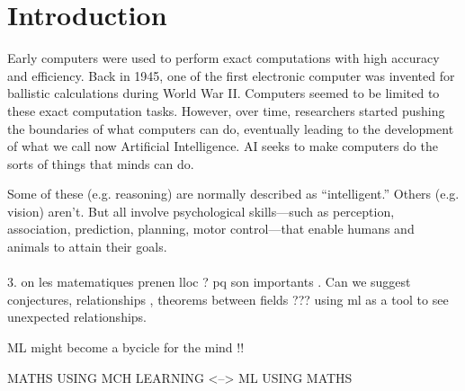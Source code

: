 \documentclass[../main.tex]{subfiles}
\begin{document}
    \chapter{Introduction} \label{ch:intro}
    


\noindent Early computers were used to perform exact computations with high accuracy and efficiency. Back in 1945, one of the first electronic computer was invented for ballistic calculations during World War II. Computers seemed to be limited to these exact computation tasks. However, over time, researchers started pushing the boundaries of what computers can do, eventually leading to the development of what we call now Artificial Intelligence. AI  seeks to make computers do the sorts of things that minds can do.

    
    
    Some of these (e.g. reasoning) are normally described as “intelligent.” Others (e.g. vision) aren’t. But all involve psychological
    skills—such as perception, association, prediction, planning, motor
    control—that enable humans and animals to attain their goals. \\ \\
    3. on les matematiques prenen lloc ? pq son importants .  Can we suggest conjectures, relationships , theorems between fields ??? using ml as a tool to see unexpected relationships. 
    
    ML might become a bycicle for the mind !!
    
    MATHS USING MCH LEARNING <--> ML USING MATHS  
    
   
\end{document}
